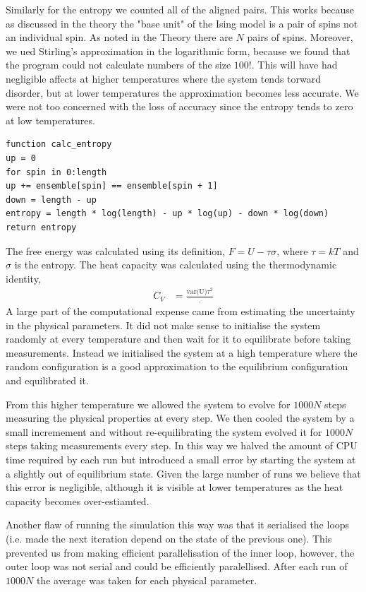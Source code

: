 \documentclass[a4paper, twocolumn]{article}
\begin{document}
Similarly for the entropy we counted all of the aligned pairs. %
This works because as discussed in the theory the "base unit" %
of the Ising model is a pair of spins not an individual spin. %
As noted in the Theory there are \(N\) pairs of spins. Moreover, %
we ued Stirling's approximation in the logarithmic form, because %
we found that the program could not calculate numbers of the size %
\(100!\). This will have had negligible affects at higher %
temperatures where the system tends torward disorder, but at %
lower temperatures the approximation becomes less accurate. %
We were not too concerned with the loss of accuracy since the %
entropy tends to zero at low temperatures.
%
\begin{verbatim}
function calc_entropy
up = 0
for spin in 0:length
up += ensemble[spin] == ensemble[spin + 1]
down = length - up
entropy = length * log(length) - up * log(up) - down * log(down)
return entropy
\end{verbatim}


The free energy was calculated using its definition, \(F = U - %
\tau\sigma\), where \(\tau = kT\) and \(\sigma\) is the entropy. %
The heat capacity was calculated using the thermodynamic %
identity,
%
\begin{align}
C_{V} &= \frac{\textrm{var(U)}{\tau^{2}}}.
\label{eqn:15}
\end{align}
%
A large part of the computational expense came from estimating the %
uncertainty in the physical parameters. It did not make sense to %
initialise the system randomly at every temperature and then wait %
for it to equilibrate before taking measurements. Instead we %
initialised the system at a high temperature where the random %
configuration is a good approximation to the equilibrium %
configuration and equilibrated it. 


From this higher temperature %
we allowed the system to evolve for \(1000N\) steps measuring %
the physical properties at every step. We then cooled the system %
by a small incremement and without re-equilibrating the system %
evolved it for \(1000N\) steps taking measurements every step. %
In this way we halved the amount of CPU time required by each run %
but introduced a small error by starting the system at a slightly %
out of equilibrium state. Given the large number of runs we believe %
that this error is negligible, although it is visible at lower %
temperatures as the heat capacity becomes over-estiamted. 


Another flaw of running the simulation this way was that it %
serialised the loops (i.e. made the next iteration depend on the %
state of the previous one). This prevented us from making efficient %
parallelisation of the inner loop, however, the outer loop was %
not serial and could be efficiently paralellised. After each run %
of \(1000N\) the average was taken for each physical parameter. 
\end{document}
